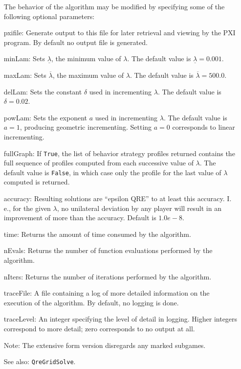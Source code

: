 \begin{itemize}
The behavior of the algorithm may be modified by specifying some of the
following optional parameters:
\bd
\item
[pxifile:] Generate output to this file for later retrieval and viewing by
the PXI program.  By default no output file is generated.
\item
[minLam:] Sets $\underline{\lambda}$, the minimum value of $\lambda$.  The 
default value is $\underline{\lambda}=0.001$.
\item
[maxLam:] Sets $\overline{\lambda}$, the maximum value of $\lambda$.  The
default value is $\overline{\lambda}=500.0$.
\item
[delLam:] Sets the constant $\delta$ used in incrementing $\lambda$.  The
default value is $\delta=0.02$.
\item
[powLam:] Sets the exponent $a$ used in incrementing $\lambda$.  The default
value is $a=1$, producing geometric incrementing.  Setting $a=0$ corresponds
to linear incrementing.
\item
[fullGraph:] If \verb+True+, the list of behavior strategy profiles
returned contains the full sequence of profiles computed from each successive
value of $\lambda$.  The default value is \verb+False+, in which case only
the profile for the last value of $\lambda$ computed is returned.
\item
[accuracy:] Resulting solutions are ``epsilon QRE'' to at least this
accuracy.  I. e., for the given $\lambda$, no unilateral deviation by
any player will result in an improvement of more than the accuracy.
Default is $1.0e-8$.
\item
[time:] Returns the amount of time consumed by the
algorithm.
\item
[nEvals:] Returns the number of function evaluations
performed by the algorithm.
\item
[nIters:] Returns the number of iterations performed
by the algorithm.
\item
[traceFile:] A file containing a log of more detailed information on
the execution of the algorithm.  By default, no logging is done.
\item
[traceLevel:] An integer specifying the level of detail in logging.
Higher integers correspond to more detail; zero corresponds to
no output at all.
\ed

\item
[Note:] The extensive form version disregards any marked
subgames.
\item [See also:] \verb+QreGridSolve+.
\ed


\end{itemize}
